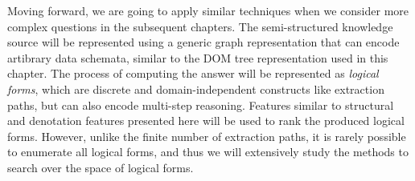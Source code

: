 Moving forward,
we are going to apply similar techniques
when we consider more complex questions
in the subsequent chapters.
The semi-structured knowledge source will be represented
using a generic graph representation
that can encode artibrary data schemata,
similar to the DOM tree representation used in this chapter.
The process of computing the answer
will be represented as \emph{logical forms},
which are discrete and domain-independent constructs 
like extraction paths,
but can also encode multi-step reasoning.
Features similar to structural and denotation features
presented here
will be used to rank the produced logical forms.
However, unlike the finite number of extraction paths,
it is rarely possible to enumerate all logical forms,
and thus we will extensively study
the methods to search over the space
of logical forms.
